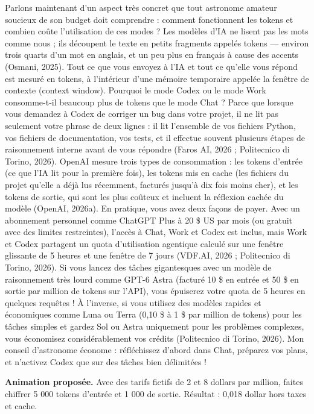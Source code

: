 \documentclass[10pt,letterpaper]{article}
\begin{document}
Parlons maintenant d'un aspect très concret que tout astronome amateur soucieux de son budget doit comprendre : comment fonctionnent les tokens et combien coûte l'utilisation de ces modes ? Les modèles d'IA ne lisent pas les mots comme nous ; ils découpent le texte en petits fragments appelés tokens — environ trois quarts d'un mot en anglais, et un peu plus en français à cause des accents (Osmani, 2025). Tout ce que vous envoyez à l'IA et tout ce qu'elle vous répond est mesuré en tokens, à l'intérieur d'une mémoire temporaire appelée la fenêtre de contexte (context window). Pourquoi le mode Codex ou le mode Work consomme-t-il beaucoup plus de tokens que le mode Chat ? Parce que lorsque vous demandez à Codex de corriger un bug dans votre projet, il ne lit pas seulement votre phrase de deux lignes : il lit l'ensemble de vos fichiers Python, vos fichiers de documentation, vos tests, et il effectue souvent plusieurs étapes de raisonnement interne avant de vous répondre (Faros AI, 2026 ; Politecnico di Torino, 2026). OpenAI mesure trois types de consommation : les tokens d'entrée (ce que l'IA lit pour la première fois), les tokens mis en cache (les fichiers du projet qu'elle a déjà lus récemment, facturés jusqu'à dix fois moins cher), et les tokens de sortie, qui sont les plus coûteux et incluent la réflexion cachée du modèle (OpenAI, 2026a). En pratique, vous avez deux façons de payer. Avec un abonnement personnel comme ChatGPT Plus à 20 \$ US par mois (ou gratuit avec des limites restreintes), l'accès à Chat, Work et Codex est inclus, mais Work et Codex partagent un quota d'utilisation agentique calculé sur une fenêtre glissante de 5 heures et une fenêtre de 7 jours (VDF.AI, 2026 ; Politecnico di Torino, 2026). Si vous lancez des tâches gigantesques avec un modèle de raisonnement très lourd comme GPT-6 Astra (facturé 10 \$ en entrée et 50 \$ en sortie par million de tokens sur l'API), vous épuiserez votre quota de 5 heures en quelques requêtes ! À l'inverse, si vous utilisez des modèles rapides et économiques comme Luna ou Terra (0,10 \$ à 1 \$ par million de tokens) pour les tâches simples et gardez Sol ou Astra uniquement pour les problèmes complexes, vous économisez considérablement vos crédits (Politecnico di Torino, 2026). Mon conseil d'astronome économe : réfléchissez d'abord dans Chat, préparez vos plans, et n'activez Codex que sur des tâches bien délimitées !\par

\smallskip\textbf{Animation proposée.} Avec des tarifs fictifs de 2 et 8 dollars par million, faites chiffrer 5 000 tokens d'entrée et 1 000 de sortie. Résultat : 0,018 dollar hors taxes et cache.
\end{document}
